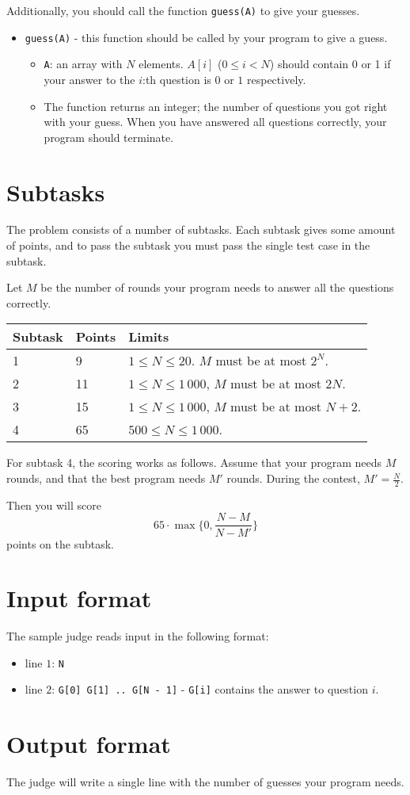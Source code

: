 Additionally, you should call the function \texttt{guess(A)} to give your guesses.
\begin{itemize}
  \item \texttt{guess(A)} - this function should be called by your program to give a guess.
    \begin{itemize}
      \item \texttt{A}: an array with $N$ elements. $A[i]$ ($0 \le i < N$) should contain 0 or 1 if your answer to the $i$:th question is $0$ or $1$ respectively.
      \item The function returns an integer; the number of questions you got right with your guess. When you have answered all questions correctly, your program should terminate.
    \end{itemize}
\end{itemize}


\section*{Subtasks}
The problem consists of a number of subtasks. Each subtask gives some amount of points, and to pass
the subtask you must pass the single test case in the subtask.

Let $M$ be the number of rounds your program needs to answer all the questions correctly.
\begin{tabular}{|l|l|l|}
  \hline
  \textbf{Subtask} & \textbf{Points} & \textbf{Limits} \\ \hline
  1 & 9 & $1 \le N \le 20$. $M$ must be at most $2^N$.  \\ \hline
  2 & 11 & $1 \le N \le 1\,000$, $M$ must be at most $2N$. \\ \hline
  3 & 15 & $1 \le N \le 1\,000$, $M$ must be at most $N + 2$. \\ \hline
  4 & 65 & $500 \le N \le 1\,000$. \\ \hline
\end{tabular}

For subtask 4, the scoring works as follows. Assume that your program needs $M$ rounds,
and that the best program needs $M'$ rounds. During the contest, $M' = \frac{N}{2}$.

Then you will score
\[ 65 \cdot \max \{ 0, \frac{N - M}{N - M'} \} \]
points on the subtask.

\section*{Input format}
The sample judge reads input in the following format:

\begin{itemize}
  \item line $1$: \texttt{N}
  \item line $2$: \texttt{G[0] G[1] .. G[N - 1]} - \texttt{G[i]} contains the answer to question $i$.
\end{itemize}

\section*{Output format}
The judge will write a single line with the number of guesses your program needs.
